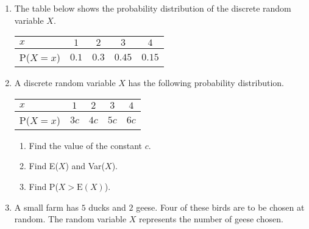 \begin{enumerate}
	\item  The table below shows the probability distribution of the discrete random variable $X$.
	\begin{table}[!htpb]
		
		\centering
		
		\begin{tabular}{|l|c|c|c|c|}
			\hline
			$x $     & $1$ & $2$ & $3$ & $4$ \\ \hline
			P($X=x$) & $0.1$ & $0.3$ & $0.45$ &$0.15$ \\ \hline
		\end{tabular}
	\end{table}
	


   \item A discrete random variable $X$ has the following probability distribution.
   
   	\begin{table}[!htpb]
   	
   	\centering
   	
   	\begin{tabular}{|l|c|c|c|c|}
   		\hline
   		$x $     & $1$ & $2$ & $3$  & $4$             \\ \hline
   		P($X=x$) & $3c$ & $4c$ & $5c$ &$6c$ \\ \hline
   	\end{tabular}
   \end{table}

\begin{enumerate}
	\item Find the value of the constant $c$.
	\item Find E($X$) and Var($X$).
	\item Find P($X > \text{E}(X)$).

\end{enumerate}

   \item   A small farm has $5$ ducks and $2$ geese. Four of these birds are to be chosen at random. The random variable $X$ represents the number of geese chosen.
   

\end{enumerate}
